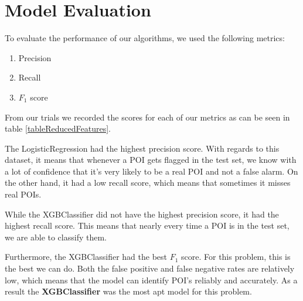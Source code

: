 \documentclass[twoside,openright,titlepage,numbers=noenddot,headinclude,%
               footinclude=true,cleardoublepage=empty,abstractoff,BCOR=5mm,%
               paper=a4,fontsize=11pt,ngerman,american]{scrreprt}
\numberwithin{theorem}{chapter}
\numberwithin{definition}{chapter}
\numberwithin{algorithm}{chapter}
\numberwithin{figure}{chapter}
\numberwithin{table}{chapter}
\numberwithin{equation}{chapter}
\begin{document}
\section*{Model Evaluation}

To evaluate the performance of our algorithms, we used the following metrics:
\begin{enumerate}
\item Precision 
\item Recall 
\item $F_1$ score
\end{enumerate}

From our trials we recorded the scores for each of our metrics as can be seen in table \ref{tableReducedFeatures}. 

The LogisticRegression had the highest precision score. With regards to this dataset, it means that whenever a POI gets flagged in the test set, we know with a lot of confidence that it's very likely to be a real POI and not a false alarm. On the other hand, it had a low recall score, which means that sometimes it misses real POIs.  

While the XGBClassifier did not have the highest precision score, it had the highest recall score. This means that nearly every time a POI is in the test set, we are able to classify them. 

Furthermore, the XGBClassifier had the best $F_1$ score. For this problem, this is the best we can do. Both the false positive and false negative rates are relatively low, which means that the model can identify POI's reliably and accurately. As a result the \textbf{XGBClassifier} was the most apt model for this problem.
\end{document}
